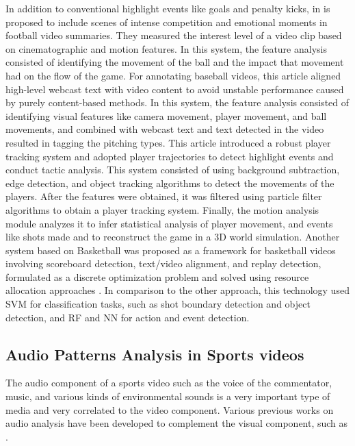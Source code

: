     In addition to conventional highlight events like goals and penalty kicks, in \cite{SoccerVideoSummarizationCinematographyMotionAnalysis} is proposed to include scenes of intense competition and emotional moments in football video summaries. They measured the interest level of a video clip based on cinematographic and motion features. In this system, the feature analysis consisted of identifying the movement of the ball and the impact that movement had on the flow of the game. For annotating baseball videos, this article \cite{WebcastText_Baseball_Videos} aligned high-level webcast text with video content to avoid unstable performance caused by purely content-based methods. In this system, the feature analysis consisted of identifying visual features like camera movement, player movement, and ball movements, and combined with webcast text and text detected in the video resulted in tagging the pitching types. This article \cite{PlayerTrackingInBroadcastBasketballVideo} introduced a robust player tracking system and adopted player trajectories to detect highlight events and conduct tactic analysis. This system consisted of using background subtraction, edge detection, and object tracking algorithms to detect the movements of the players. After the features were obtained, it was filtered using particle filter algorithms to obtain a player tracking system. Finally, the motion analysis module analyzes it to infer statistical analysis of player movement, and events like shots made and to reconstruct the game in a 3D world simulation. Another system based on Basketball was proposed as a framework for basketball videos involving scoreboard detection, text/video alignment, and replay detection, formulated as a discrete optimization problem and solved using resource allocation approaches \cite{BasketballNovelFramework}. In comparison to the other approach, this technology used \gls{SVM} for classification tasks, such as shot boundary detection and object detection, and \gls{RF} and \gls{NN} for action and event detection.  

\subsection{Audio Patterns Analysis in Sports videos}

    The audio component of a sports video such as the voice of the commentator, music, and various kinds of environmental sounds is a very important type of media and very correlated to the video component. Various previous works on audio analysis have been developed to complement the visual component, such as \cite{AutomaticDetectionGoalSegmentsBasketball}\cite{AutomaticextractionHighlightsBaseball}\cite{AudioKeywordsSoccerVideo}.

